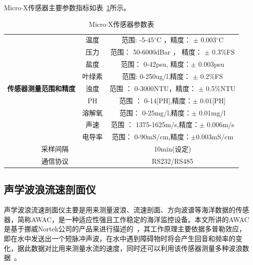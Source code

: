 Micro$\cdot$X传感器主要参数指标如表~\ref{tab:MicroX}所示。
\begin{table}[h]
  \centering\small
  \caption{Micro$\cdot$X传感器参数表}
  \label{tab:MicroX}
\begin{tabular}{|c|c|c|}
\hline
\multirow{9}{*}{\bf 传感器测量范围和精度}      & 温度       & 范围: -5-45$^{\circ}$C  ，精度：  $\pm$ 0.003$^{\circ}$C          \\ \cline{2-3} 
                                           & 压力       & 范围： 
 50-6000dBar ， 精度： $\pm$ 0.3\%FS                 \\ \cline{2-3} 
                                           & 盐度       & 范围：
0-42psu, 精度：$\pm$ 0.003psu              \\ \cline{2-3} 
                                           & 叶绿素      & 范围:
0-250ug/l,精度：   $\pm$ 0.2\%FS            \\ \cline{2-3} 
                                           & 浊度       & 范围 ：
0-3000NTU，精度：   $\pm$ 0.5\%NTU         \\ \cline{2-3} 
                                           & PH       & 范围 ：
0-14[PH],精度：$\pm$ 0.01[PH]             \\ \cline{2-3} 
                                           & 溶解氧      & 范围：
0-25mg/l,精度：$\pm$ 0.01mg/l               \\ \cline{2-3} 
                                           & 声速       & 范围 ：
1375-1625m/s,精度：$\pm$ 0.006m/s           \\ \cline{2-3} 
                                           & 电导率      & 范围：
0-90mS/cm,精度：$\pm$0.003mS/cm            \\ \hline
\multicolumn{2}{|c|}{采样间隔}                  & 10min(设定)                         \\ \hline
\multicolumn{2}{|c|}{通信协议}                  & \multicolumn{1}{c|}{RS232/RS485}       \\ \hline
\end{tabular}
\end{table}


\subsection{声学波浪流速剖面仪}
声学波浪流速剖面仪主要是用来测量波浪、流速剖面、方向波谱等海洋数据的传感器，简称AWAC，是一种适应性强且工作稳定的海洋监控设备。本文所讲的AWAC是基于挪威Nortek公司的产品来进行描述的~\cite{foteinis2017comparative}，其工作原理主要依据多普勒效应，即在水中发送出一个短脉冲声波，在水中遇到障碍物时将会产生回音和频率的变化，据此数据对比用来测量水流的速度，同时还可以利用该传感器测量多种波浪数据~\cite{2016xcc}。

